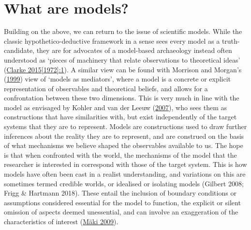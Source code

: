 \documentclass[
  12pt,
  a4paper,
  oneside]{book}
\begin{document}
\hypertarget{what-are-models}{%
\section{What are models?}\label{what-are-models}}

Building on the above, we can return to the issue of scientific models. While the classic hypothetico-deductive framework in a sense sees every model as a truth-candidate, they are for advocates of a model-based archaeology instead often understood as `pieces of machinery that relate observations to theoretical ideas' (\protect\hyperlink{ref-clarke1972}{Clarke 2015{[}1972{]}:1}). A similar view can be found with Morrison and Morgan's (\protect\hyperlink{ref-morrison1999}{1999}) view of `models as mediators', where a model is a concrete or explicit representation of observables and theoretical beliefs, and allows for a confrontation between these two dimensions. This is very much in line with the model as envisaged by Kohler and van der Leeuw (\protect\hyperlink{ref-kohler2007}{2007}), who sees them as constructions that have similarities with, but exist independently of the target systems that they are to represent. Models are constructions used to draw further inferences about the reality they are to represent, and are construed on the basis of what mechanisms we believe shaped the observables available to us. The hope is that when confronted with the world, the mechanisms of the model that the researcher is interested in correspond with those of the target system. This is how models have often been cast in a realist understanding, and variations on this are sometimes termed credible worlds, or idealised or isolating models (Gilbert 2008; Frigg \& Hartmann 2018). These entail the inclusion of boundary conditions or assumptions considered essential for the model to function, the explicit or silent omission of aspects deemed unessential, and can involve an exaggeration of the characteristics of interest (\protect\hyperlink{ref-muxe4ki2009}{Mäki 2009}).
\end{document}

